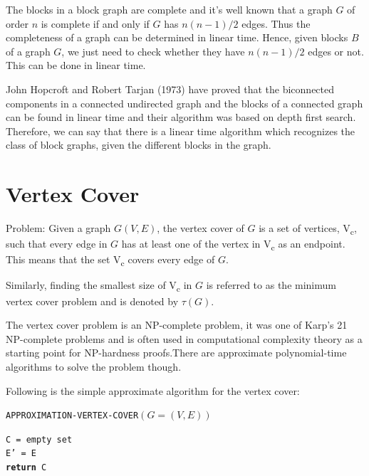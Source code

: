 \documentclass{memoir}
\begin{document}
The blocks in a block graph are complete and it's well known that a graph $G$ of order $n$ is complete if and only if $G$ has $n(n-1)/2$ edges. Thus the completeness of a graph can be determined in linear time. Hence, given blocks $B$ of a graph $G$, we just need to check whether they have $n(n-1)/2$ edges or not. This can be done in linear time.

John Hopcroft and Robert Tarjan (1973) have proved that the biconnected components in a connected undirected graph and the blocks of a connected graph can be found in linear time and their algorithm was based on depth first search.
Therefore, we can say that there is a linear time algorithm which recognizes the class of block graphs, given the different blocks in the graph.
\section*{Vertex Cover}

Problem: Given a graph $G(V, E)$, the vertex cover of $G$ is a set of vertices, V\textsubscript{c}, such that every edge in $G$ has at least one of the vertex in V\textsubscript{c} as an endpoint. This means that the set V\textsubscript{c} covers every edge of $G$.

Similarly, finding the smallest size of V\textsubscript{c} in $G$ is referred to as the minimum vertex cover problem and is denoted by \begin{math}
    \tau (G). \end{math}

The vertex cover problem is an NP-complete problem, it was one of Karp's 21 NP-complete problems and is often used in computational complexity theory as a starting point for NP-hardness proofs.There are approximate polynomial-time algorithms to solve the problem though.

Following is the simple approximate algorithm for the vertex cover:

\begin{center}
\caption{\texttt{APPROXIMATION-VERTEX-COVER$(G = (V, E))$}}
		\begin{algorithmic}[H]
            \SetAlgoLined
            \texttt{C = empty set\\
            E' = E\\
             \textbf{return} C
             }
        \end{algorithmic}
\end{center}
\end{document}
